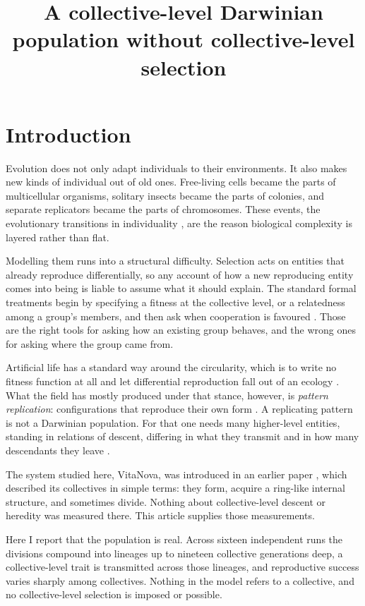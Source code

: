 \documentclass{artificial-life}
\title{A collective-level Darwinian population
without collective-level selection}
\begin{document}
\coverpage           %
\linenumbers         %
\doublespacing       %

\section{Introduction}

Evolution does not only adapt individuals to their environments. It also makes
new kinds of individual out of old ones. Free-living cells became the parts of
multicellular organisms, solitary insects became the parts of colonies, and
separate replicators became the parts of chromosomes. These events, the
evolutionary transitions in individuality
\citep{smith1995major,west2015major}, are the reason biological complexity is
layered rather than flat.

Modelling them runs into a structural difficulty. Selection acts on entities
that already reproduce differentially, so any account of how a new reproducing
entity comes into being is liable to assume what it should explain. The standard
formal treatments begin by specifying a fitness at the collective level, or a
relatedness among a group's members, and then ask when cooperation is favoured
\citep{okasha2005multilevel,hamilton1964genetical}. Those are the right tools
for asking how an existing group behaves, and the wrong ones for asking where
the group came from.

Artificial life has a standard way around the circularity, which is to write no
fitness function at all and let differential reproduction fall out of an ecology
\citep{ray1991approach,yaeger1994polyworld,channon2001geb}. What the field has
mostly produced under that stance, however, is \emph{pattern replication}:
configurations that reproduce their own form
\citep{langton1984self,sayama1999evoloop,chan2020lenia}. A replicating pattern
is not a Darwinian population. For that one needs many higher-level entities,
standing in relations of descent, differing in what they transmit and in how
many descendants they leave \citep{godfreysmith2009}.

The system studied here, VitaNova, was introduced in an earlier paper
\citep{le2025vitanova}, which described its collectives in simple terms: they
form, acquire a ring-like internal structure, and sometimes divide. Nothing
about collective-level descent or heredity was measured there. This article
supplies those measurements.

Here I report that the population is real. Across sixteen independent runs the
divisions compound into lineages up to nineteen collective generations deep, a
collective-level trait is transmitted across those lineages, and reproductive
success varies sharply among collectives. Nothing in the model refers to a
collective, and no collective-level selection is imposed or possible.
\end{document}
